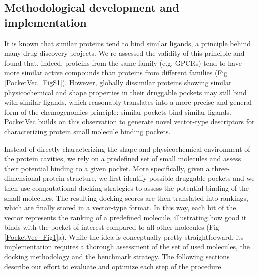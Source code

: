 
\subsection{Methodological development and implementation}

It is known that similar proteins tend to bind similar ligands\cite{klabunde_chemogenomic_2007}, a principle behind many drug discovery projects\cite{sydow_advances_2019, keiser_relating_2007, falaguera_illuminating_2023}. We re-assessed the validity of this principle and found that, indeed, proteins from the same family (e.g. GPCRs) tend to have more similar active compounds than proteins from different families (Fig \ref{PocketVec_FigS1}). However, globally dissimilar proteins showing similar physicochemical and shape properties in their druggable pockets may still bind with similar ligands, which reasonably translates into a more precise and general form of the chemogenomics principle: similar pockets bind similar ligands\cite{gao_comprehensive_2013}. PocketVec builds on this observation to generate novel vector-type descriptors for characterizing protein small molecule binding pockets. 

Instead of directly characterizing the shape and physicochemical environment of the protein
cavities, we rely on a predefined set of small molecules and assess their potential binding to a
given pocket. More specifically, given a three-dimensional protein structure, we first identify
possible druggable pockets and we then use computational docking strategies to assess the
potential binding of the small molecules. The resulting docking scores are then translated into
rankings, which are finally stored in a vector-type format. In this way, each bit of the vector
represents the ranking of a predefined molecule, illustrating how good it binds with the pocket of
interest compared to all other molecules (Fig \ref{PocketVec_Fig1}a). While the idea is conceptually pretty straightforward, its implementation requires a thorough assessment of the set of used molecules, the docking methodology and the benchmark strategy. The following sections describe our effort to evaluate and optimize each step of the procedure.



